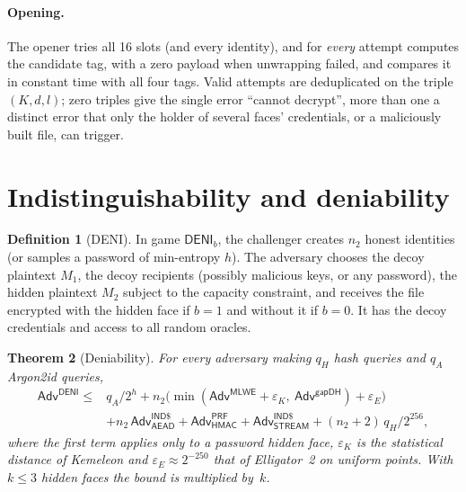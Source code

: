 \documentclass[11pt,a4paper]{article}
\newtheorem{theorem}{Theorem}
\theoremstyle{definition}
\newtheorem{definition}[theorem]{Definition}
\theoremstyle{remark}
\newcommand{\Adv}{\mathsf{Adv}}
\newcommand{\HMAC}{\mathsf{HMAC}}
\newcommand{\AEAD}{\mathsf{AEAD}}
\begin{document}
\paragraph{Opening.} The opener tries all 16 slots (and every identity), and for \emph{every} attempt computes the candidate tag, with a zero payload when unwrapping failed, and compares it in constant time with all four tags. Valid attempts are deduplicated on the triple $(K,d,l)$; zero triples give the single error ``cannot decrypt'', more than one a distinct error that only the holder of several faces' credentials, or a maliciously built file, can trigger.

\section{Indistinguishability and deniability}
\label{sec:deni}

\begin{definition}[DENI]
In game $\mathsf{DENI}_b$, the challenger creates $n_2$ honest identities (or samples a password of min-entropy $h$). The adversary chooses the decoy plaintext $M_1$, the decoy recipients (possibly malicious keys, or any password), the hidden plaintext $M_2$ subject to the capacity constraint, and receives the file encrypted with the hidden face if $b=1$ and without it if $b=0$. It has the decoy credentials and access to all random oracles.
\end{definition}

\begin{theorem}[Deniability]
\label{thm:deni}
For every adversary making $q_H$ hash queries and $q_A$ Argon2id queries,
\begin{align*}
\Adv^{\mathsf{DENI}} \le{}& q_A/2^h + n_2\big(\min(\Adv^{\mathsf{MLWE}} + \varepsilon_K,\ \Adv^{\mathsf{gapDH}}) + \varepsilon_E\big)\\
&+ n_2\,\Adv^{\mathsf{IND\$}}_{\AEAD} + \Adv^{\mathsf{PRF}}_{\HMAC} + \Adv^{\mathsf{IND\$}}_{\mathsf{STREAM}} + (n_2+2)\,q_H/2^{256},
\end{align*}
where the first term applies only to a password hidden face, $\varepsilon_K$ is the statistical distance of Kemeleon and $\varepsilon_E\approx 2^{-250}$ that of Elligator~2 on uniform points. With $k\le 3$ hidden faces the bound is multiplied by~$k$.
\end{theorem}
\end{document}
